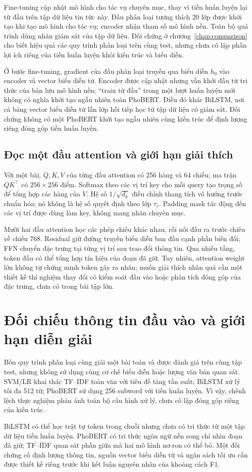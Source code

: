 Fine-tuning cập nhật mô hình cho tác vụ chuyên mục, thay vì tiền huấn luyện lại từ đầu trên tập dữ liệu tin tức này. Đầu phân loại tương thích 20 lớp được khởi tạo khi tạo mô hình cho tác vụ; encoder nhận tham số mô hình nền. Toàn bộ quá trình dùng nhãn giám sát của tập dữ liệu. Đối chứng ở chương~\ref{chap:comparison} cho biết hiệu quả các quy trình phân loại trên cùng test, nhưng chưa cô lập phần lợi ích riêng của tiền huấn luyện khỏi kiến trúc và biểu diễn.



Ở bước fine-tuning, gradient của đầu phân loại truyền qua biểu diễn $h_0$ vào encoder và vector biểu diễn từ. Encoder được cập nhật nhưng vẫn khởi đầu từ tri thức của bản lưu mô hình nền; ``train từ đầu'' trong một lượt huấn luyện mới không có nghĩa khởi tạo ngẫu nhiên toàn PhoBERT. Điều đó khác BiLSTM, nơi cả bảng vector biểu diễn từ lẫn lớp hồi tiếp học từ tập dữ liệu có giám sát. Đối chứng không có một PhoBERT khởi tạo ngẫu nhiên cùng kiến trúc để định lượng riêng đóng góp tiền huấn luyện.

\subsection{Đọc một đầu attention và giới hạn giải thích}
Với một bài, $Q,K,V$ của từng đầu attention có 256 hàng và 64 chiều; ma trận $QK^\top$ có $256\times256$ điểm. Softmax theo các vị trí key cho mỗi query tạo trọng số để tổng hợp các hàng của $V$. Hệ số $1/\sqrt{d_k}$ điều chỉnh thang tích vô hướng trước chuẩn hóa; nó không là hệ số quyết định theo lớp $\tau_c$. Padding mask tác động đến các vị trí được dùng làm key, không mang nhãn chuyên mục.

Mười hai đầu attention học các phép chiếu khác nhau, rồi nối đầu ra trước chiếu về chiều 768. Residual giữ đường truyền biểu diễn ban đầu cạnh phần biến đổi; FFN chuyển đặc trưng tại từng vị trí sau trao đổi thông tin. Qua nhiều tầng, token đầu có thể tổng hợp tín hiệu của đoạn đã giữ. Tuy nhiên, attention weight lớn không tự chứng minh token gây ra nhãn; muốn giải thích nhân quả cần một thiết kế thí nghiệm thay đổi có kiểm soát đầu vào hoặc phân tích đóng góp của đặc trưng, chưa có trong bài tập lớn.

\FloatBarrier
\section{Đối chiếu thông tin đầu vào và giới hạn diễn giải}
Bốn quy trình phân loại cùng giải một bài toán và được đánh giá trên cùng tập test, nhưng không sử dụng cùng cơ chế biểu diễn hoặc lượng văn bản quan sát. SVM/LR khai thác TF--IDF toàn văn với tiêu đề tăng tần suất; BiLSTM xử lý tối đa 512 từ; PhoBERT sử dụng 256 subword với tiền huấn luyện. Vì vậy, chênh lệch thực nghiệm phản ánh toàn bộ cấu hình xử lý, chưa cô lập đóng góp riêng của kiến trúc.

BiLSTM có thể học trật tự token trong chuỗi nhưng chưa có tri thức từ một tập dữ liệu tiền huấn luyện. PhoBERT có tri thức ngôn ngữ nền song chỉ nhìn đoạn đã giữ; TF--IDF quan sát phần giữa mà hai mô hình nơ-ron có thể bỏ. Một đối chứng cố định lượng thông tin, nguồn vector biểu diễn từ và ngân sách tối ưu cần được thiết kế riêng trước khi kết luận nguyên nhân của khoảng cách F1.
